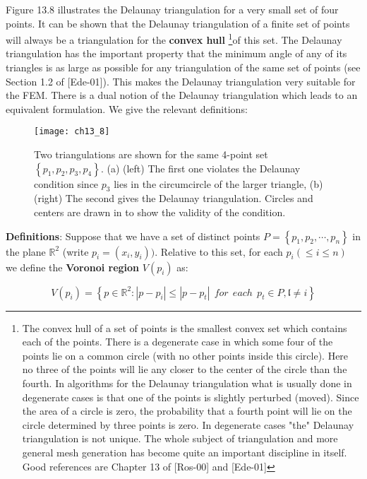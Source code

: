\documentclass[../main.tex]{subfiles}
\begin{document}
Figure 13.8 illustrates the Delaunay triangulation for a very small set of four points. It can be shown that the Delaunay triangulation of a finite set of points will always be a triangulation for the \textbf{convex hull}
\footnote{The convex hull of a set of points is the smallest convex set which contains each of the points. There is a degenerate case in which some four of the points lie on a common circle (with no other points inside this circle). Here no three of the points will lie any closer to the center of the circle than the fourth. In algorithms for the Delaunay triangulation what is usually done in degenerate cases is that one of the points is slightly perturbed (moved). Since the area of a circle is zero, the probability that a fourth point will lie on the circle determined by three points is zero. In degenerate cases "the" Delaunay triangulation is not unique. The whole subject of triangulation and more general mesh generation has become quite an important discipline in itself. Good references are Chapter 13 of [Ros-00] and [Ede-01]}of this set. The Delaunay triangulation has the important property that the minimum angle of any of its triangles is as large as possible for any triangulation of the same set of points (see Section 1.2 of [Ede-01]). This makes the Delaunay triangulation very suitable for the FEM. There is a dual notion of the Delaunay triangulation which leads to an equivalent formulation. We give the relevant definitions: 

\begin{figure}[H]
	\centering
	\texttt{[image: ch13\_8]}
	\caption{\textsf{Two triangulations are shown for the same 4-point set $\left\{ p_1,p_2,p_3, p_4 \right\}$. (a) (left) The first one violates the Delaunay condition since $p_3$ lies in the circumcircle of the larger triangle, (b) (right) The second gives the Delaunay triangulation. Circles and centers are drawn in to show the validity of the condition. }}
	\label{pfig:ch13_8}
\end{figure}

\textbf{Definitions}: Suppose that we have a set of distinct points $P=\left\{ p_1,p_2, \cdots,p_n \right\}$ in the plane $\mathbb{R}^2$ (write $p_i=(x_i,y_i))$. Relative to this set, for each $p_i(\leqslant i \leqslant n)$ we define the \textbf{Voronoi region} $V(p_i)$ as: 

\begin{equation}
V(p_i)= \left\{ p \in \mathbb{R}^2 : |p-p_i| \leqslant |p-p_t|~~for~~each~~p_t \in P, \mathfrak{l} \neq i  \right\}
\end{equation}
\end{document}
